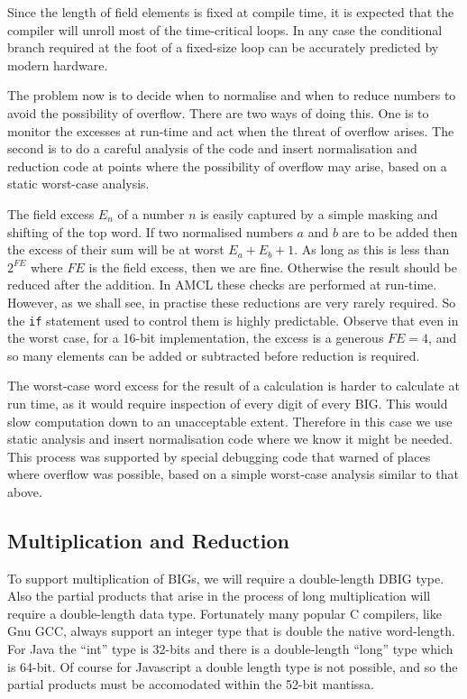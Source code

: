 \documentclass{llncs}
\begin{document}
Since the length of field elements is fixed at compile time, it is expected that the compiler will unroll most of the time-critical loops. In any case the conditional branch required at the foot of a 
fixed-size loop can be accurately predicted by modern hardware.

The problem now is to decide when to normalise and when to reduce numbers to avoid the possibility of overflow. There are two ways of doing this. One is to monitor the excesses at run-time and act when the 
threat of overflow arises. The second is to do a careful analysis of the code and insert normalisation and reduction code at points where the possibility of overflow may arise, based on a static worst-case 
analysis. 

The field excess $E_n$ of a number $n$ is easily captured by a simple masking and shifting of the top word. If two normalised numbers $a$ and $b$ are to be added then the excess of their sum will be at worst 
$E_a + E_b + 1$. As long as this is less than $2^{FE}$ where $FE$ is the field excess, then we are fine. Otherwise the result should be reduced after the addition. In AMCL these checks are 
performed at run-time. However, as we shall see, in practise these reductions are very rarely required. So the {\tt if} statement used to control them is highly predictable. Observe that even
in the worst case, for a 16-bit implementation, the excess is a generous $FE=4$, and so many elements can be added or subtracted before reduction is required.

The worst-case word excess for the result of a calculation is harder to calculate at run time, as it would require inspection of every digit of every {BIG}. This would slow computation down to an unacceptable extent. 
Therefore in this case
we use static analysis and insert normalisation code where we know it might be needed. This process was supported by special debugging code that warned of places where overflow was possible, based on a simple
worst-case analysis similar to that above.

\subsection{Multiplication and Reduction}

To support multiplication of {BIG}s, we will require a double-length {DBIG} type. Also the partial products that arise in the process of long multiplication will require a double-length data type. Fortunately many 
popular C compilers, like Gnu {GCC}, always support an integer type that is double the native word-length. For Java the ``int'' type is 32-bits and there is a double-length ``long'' type which is 64-bit.
Of course for Javascript a double length type is not possible, and so the partial products must be accomodated within the 52-bit mantissa.
\end{document}
